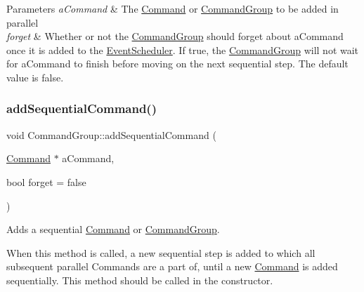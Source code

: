 \begin{DoxyParams}{Parameters}
{\em a\+Command} & The \mbox{\hyperlink{classlib_iterative_robot_1_1_command}{Command}} or \mbox{\hyperlink{classlib_iterative_robot_1_1_command_group}{Command\+Group}} to be added in parallel \\
\hline
{\em forget} & Whether or not the \mbox{\hyperlink{classlib_iterative_robot_1_1_command_group}{Command\+Group}} should forget about a\+Command once it is added to the \mbox{\hyperlink{classlib_iterative_robot_1_1_event_scheduler}{Event\+Scheduler}}. If true, the \mbox{\hyperlink{classlib_iterative_robot_1_1_command_group}{Command\+Group}} will not wait for a\+Command to finish before moving on the next sequential step. The default value is false. \\
\hline
\end{DoxyParams}
\mbox{\label{classlib_iterative_robot_1_1_command_group_a7e3167a89a45e6b1fc5df9a18c2946b7}} 
\subsubsection{\texorpdfstring{addSequentialCommand()}{addSequentialCommand()}}
{\footnotesize\ttfamily void Command\+Group\+::add\+Sequential\+Command (\begin{DoxyParamCaption}\item[{\mbox{\hyperlink{classlib_iterative_robot_1_1_command}{Command}} $\ast$}]{a\+Command,  }\item[{bool}]{forget = {\ttfamily false} }\end{DoxyParamCaption})}



Adds a sequential \mbox{\hyperlink{classlib_iterative_robot_1_1_command}{Command}} or \mbox{\hyperlink{classlib_iterative_robot_1_1_command_group}{Command\+Group}}. 

When this method is called, a new sequential step is added to which all subsequent parallel Commands are a part of, until a new \mbox{\hyperlink{classlib_iterative_robot_1_1_command}{Command}} is added sequentially. This method should be called in the constructor.



